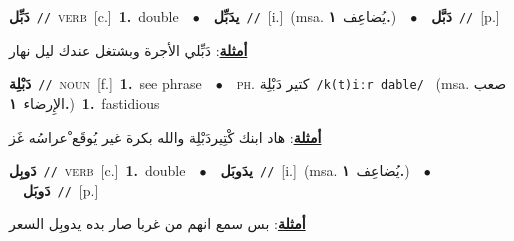 \documentclass[10pt,a4paper,twoside]{article} %
\begin{document}
\begin{multicols}{2}
{{{{{{\setlength\topsep{0pt}\textbf{\foreignlanguage{arabic}{دَبِّل}}\ {\color{gray}\texttt{//}\color{black}}\ \textsc{verb}\ [c.]\ \textbf{1.}~double\ \ $\bullet$\ \ \setlength\topsep{0pt}\textbf{\foreignlanguage{arabic}{يدَبِّل}}\ {\color{gray}\texttt{//}\color{black}}\ [i.]\ \color{gray}(msa. \foreignlanguage{arabic}{يُضاعِف}~\foreignlanguage{arabic}{\textbf{١.}})\color{black}\ \ $\bullet$\ \ \setlength\topsep{0pt}\textbf{\foreignlanguage{arabic}{دَبَّل}}\ {\color{gray}\texttt{//}\color{black}}\ [p.]\  \begin{flushright}\color{gray}\foreignlanguage{arabic}{\textbf{\underline{\foreignlanguage{arabic}{أمثلة}}}: دَبِّلي الأجرة وبشتغل عندك ليل نهار}\end{flushright}\color{black}} \vspace{2mm}

{\setlength\topsep{0pt}\textbf{\foreignlanguage{arabic}{دَبْلِة}}\ {\color{gray}\texttt{//}\color{black}}\ \textsc{noun}\ [f.]\ \textbf{1.}~see phrase\ \ $\bullet$\ \ \textsc{ph.} \color{gray} \foreignlanguage{arabic}{كتير دَبْلِة}\color{black}\ {\color{gray}\texttt{/{\sffamily k(t)iːr dable}/}\color{black}}\ \color{gray} (msa. \foreignlanguage{arabic}{صعب الإِرضاء}~\foreignlanguage{arabic}{\textbf{١.}})\color{black}\ \textbf{1.}~fastidious\  \begin{flushright}\color{gray}\foreignlanguage{arabic}{\textbf{\underline{\foreignlanguage{arabic}{أمثلة}}}: هاد ابنك كْتِيردَبْلِة والله بكرة غير يُوقَع ْعراسُه غَز}\end{flushright}\color{black}} \vspace{2mm}

{\setlength\topsep{0pt}\textbf{\foreignlanguage{arabic}{دَوبِل}}\ {\color{gray}\texttt{//}\color{black}}\ \textsc{verb}\ [c.]\ \textbf{1.}~double\ \ $\bullet$\ \ \setlength\topsep{0pt}\textbf{\foreignlanguage{arabic}{يدَوبَل}}\ {\color{gray}\texttt{//}\color{black}}\ [i.]\ \color{gray}(msa. \foreignlanguage{arabic}{يُضاعِف}~\foreignlanguage{arabic}{\textbf{١.}})\color{black}\ \ $\bullet$\ \ \setlength\topsep{0pt}\textbf{\foreignlanguage{arabic}{دَوبَل}}\ {\color{gray}\texttt{//}\color{black}}\ [p.]\  \begin{flushright}\color{gray}\foreignlanguage{arabic}{\textbf{\underline{\foreignlanguage{arabic}{أمثلة}}}: بس سمع انهم من غربا صار بده يدوبِل السعر}\end{flushright}\color{black}} \vspace{2mm}

}}}}}
\end{multicols}
\end{document}
